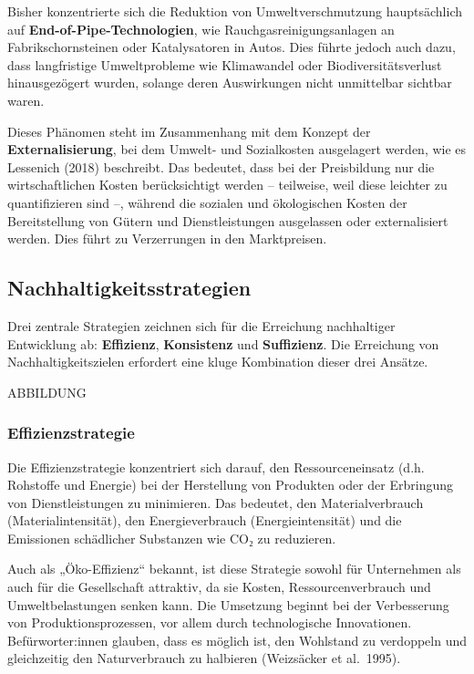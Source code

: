 \documentclass[
  letterpaper,
  DIV=11,
  numbers=noendperiod]{scrartcl}
\begin{document}
Bisher konzentrierte sich die Reduktion von Umweltverschmutzung
hauptsächlich auf \textbf{End-of-Pipe-Technologien}, wie
Rauchgasreinigungsanlagen an Fabrikschornsteinen oder Katalysatoren in
Autos. Dies führte jedoch auch dazu, dass langfristige Umweltprobleme
wie Klimawandel oder Biodiversitätsverlust hinausgezögert wurden,
solange deren Auswirkungen nicht unmittelbar sichtbar waren.

Dieses Phänomen steht im Zusammenhang mit dem Konzept der
\textbf{Externalisierung}, bei dem Umwelt- und Sozialkosten ausgelagert
werden, wie es Lessenich (2018) beschreibt. Das bedeutet, dass bei der
Preisbildung nur die wirtschaftlichen Kosten berücksichtigt werden --
teilweise, weil diese leichter zu quantifizieren sind --, während die
sozialen und ökologischen Kosten der Bereitstellung von Gütern und
Dienstleistungen ausgelassen oder externalisiert werden. Dies führt zu
Verzerrungen in den Marktpreisen.

\subsection{Nachhaltigkeitsstrategien}\label{nachhaltigkeitsstrategien}

Drei zentrale Strategien zeichnen sich für die Erreichung nachhaltiger
Entwicklung ab: \textbf{Effizienz}, \textbf{Konsistenz} und
\textbf{Suffizienz}. Die Erreichung von Nachhaltigkeitszielen erfordert
eine kluge Kombination dieser drei Ansätze.

ABBILDUNG

\subsubsection{Effizienzstrategie}\label{effizienzstrategie}

Die Effizienzstrategie konzentriert sich darauf, den Ressourceneinsatz
(d.h. Rohstoffe und Energie) bei der Herstellung von Produkten oder der
Erbringung von Dienstleistungen zu minimieren. Das bedeutet, den
Materialverbrauch (Materialintensität), den Energieverbrauch
(Energieintensität) und die Emissionen schädlicher Substanzen wie CO₂ zu
reduzieren.

Auch als „Öko-Effizienz`` bekannt, ist diese Strategie sowohl für
Unternehmen als auch für die Gesellschaft attraktiv, da sie Kosten,
Ressourcenverbrauch und Umweltbelastungen senken kann. Die Umsetzung
beginnt bei der Verbesserung von Produktionsprozessen, vor allem durch
technologische Innovationen. Befürworter:innen glauben, dass es möglich
ist, den Wohlstand zu verdoppeln und gleichzeitig den Naturverbrauch zu
halbieren (Weizsäcker et al.~1995).
\end{document}
